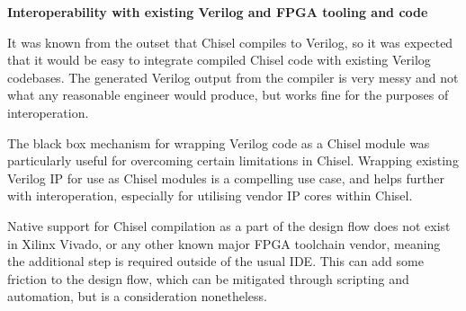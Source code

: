 \textbf{Interoperability with existing Verilog and FPGA tooling and code}

It was known from the outset that Chisel compiles to Verilog, so it was expected that it would be easy to integrate compiled Chisel code with existing Verilog codebases. The generated Verilog output from the compiler is very messy and not what any reasonable engineer would produce, but works fine for the purposes of interoperation.

The black box mechanism for wrapping Verilog code as a Chisel module was particularly useful for overcoming certain limitations in Chisel. Wrapping existing Verilog IP for use as Chisel modules is a compelling use case, and helps further with interoperation, especially for utilising vendor IP cores within Chisel.

Native support for Chisel compilation as a part of the design flow does not exist in Xilinx Vivado, or any other known major FPGA toolchain vendor, meaning the additional step is required outside of the usual IDE. This can add some friction to the design flow, which can be mitigated through scripting and automation, but is a consideration nonetheless.

